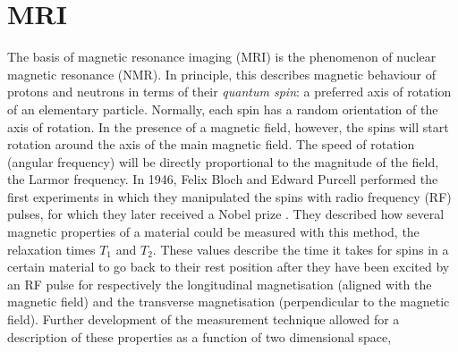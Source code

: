 \section*{MRI}
The basis of magnetic resonance imaging (MRI) is the phenomenon of nuclear magnetic resonance (NMR). In principle, this describes magnetic behaviour of protons and neutrons in terms of their \emph{quantum spin}: a preferred axis of rotation of an elementary particle. Normally, each spin has a random orientation of the axis of rotation. In the presence of a magnetic field, however, the spins will start rotation around the axis of the main magnetic field. The speed of rotation (angular frequency) will be directly proportional to the magnitude of the field, the Larmor frequency. In 1946, Felix Bloch and Edward Purcell %
performed the first experiments in which they manipulated the spins with radio frequency (RF) pulses, for which they later received a Nobel prize \cite{Bloch1946}. They described how several magnetic properties of a material could be measured with this method, the relaxation times $T_1$ and $T_2$. %
These values describe the time it takes for spins in a certain material to go back to their rest position after they have been excited by an RF pulse for respectively the longitudinal magnetisation (aligned with the magnetic field) and the transverse magnetisation (perpendicular to the magnetic field). %
Further development of the measurement technique allowed for a description of these properties as a function of two dimensional space,%


